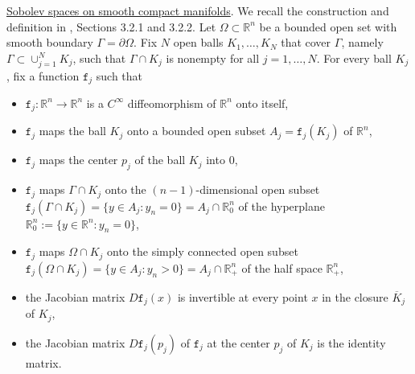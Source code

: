 \documentclass[10pt,reqno,a4paper]{article}
\numberwithin{equation}{section}
\theoremstyle{plain}
\theoremstyle{definition}
\newcommand{\R}{{\mathbb R}}
\newcommand{\Om}{\Omega}
\newcommand{\pa}{\partial}
\begin{document}
\underline{Sobolev spaces on smooth compact manifolds}.
We recall the construction and definition 
in \cite{Triebel.1983}, Sections 3.2.1 and 3.2.2. 
Let $\Om \subset \R^n$ be a bounded open set with smooth boundary $\Gamma = \pa \Om$.
Fix $N$ open balls $K_1 , \ldots, K_N$ that cover $\Gamma$, 
namely $\Gamma \subset \cup_{j=1}^N K_j$, 
such that $\Gamma \cap K_j$ is nonempty for all $j = 1, \ldots, N$. 
For every ball $K_j$, fix a function $\mathtt f_j$ such that 
\begin{itemize}

\vspace{-4pt}

\item[$(i)$] 
$\mathtt f_j : \R^n \to \R^n$ is a $C^\infty$ diffeomorphism of $\R^n$ onto itself, 

\vspace{-7pt}

\item[$(ii)$] 
$\mathtt f_j$ maps the ball $K_j$ onto a bounded open subset $A_j = \mathtt f_j(K_j)$ of $\R^n$, 

\vspace{-7pt}

\item[$(iii)$]
$\mathtt f_j$ maps the center $p_j$ of the ball $K_j$ into $0$, 

\vspace{-7pt}

\item[$(iv)$] 
$\mathtt f_j$ maps $\Gamma \cap K_j$ onto the $(n-1)$-dimensional open subset 
$\mathtt f_j(\Gamma \cap K_j) = \{ y \in A_j : y_n = 0 \} = A_j \cap \R^n_0$ 
of the hyperplane $\R^n_0 := \{ y \in \R^n : y_n = 0 \}$, 

\vspace{-7pt}

\item[$(v)$] 
$\mathtt f_j$ maps $\Om \cap K_j$ onto the simply connected open subset 
$\mathtt f_j(\Om \cap K_j) = \{ y \in A_j : y_n > 0 \} = A_j \cap \R^n_+$ of the half space $\R^n_+$,

\vspace{-7pt}

\item[$(vi)$] 
the Jacobian matrix $D \mathtt f_j(x)$ is invertible at every point $x$ 
in the closure $\overline{K}_j$ of $K_j$,

\vspace{-7pt}

\item[$(vii)$] 
the Jacobian matrix $D \mathtt f_j(p_j)$ of $\mathtt f_j$ at the center $p_j$ of $K_j$ 
is the identity matrix. 
\end{itemize}
\end{document}
